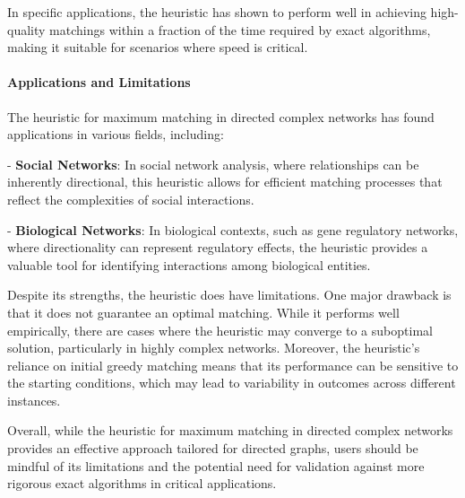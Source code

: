 In specific applications, the heuristic has shown to perform well in achieving high-quality matchings within a fraction of the time required by exact algorithms, making it suitable for scenarios where speed is critical.

\paragraph{Applications and Limitations}
The heuristic for maximum matching in directed complex networks has found applications in various fields, including:

- \textbf{Social Networks}: In social network analysis, where relationships can be inherently directional, this heuristic allows for efficient matching processes that reflect the complexities of social interactions.
  
- \textbf{Biological Networks}: In biological contexts, such as gene regulatory networks, where directionality can represent regulatory effects, the heuristic provides a valuable tool for identifying interactions among biological entities.

Despite its strengths, the heuristic does have limitations. One major drawback is that it does not guarantee an optimal matching. While it performs well empirically, there are cases where the heuristic may converge to a suboptimal solution, particularly in highly complex networks. Moreover, the heuristic's reliance on initial greedy matching means that its performance can be sensitive to the starting conditions, which may lead to variability in outcomes across different instances.

Overall, while the heuristic for maximum matching in directed complex networks provides an effective approach tailored for directed graphs, users should be mindful of its limitations and the potential need for validation against more rigorous exact algorithms in critical applications.